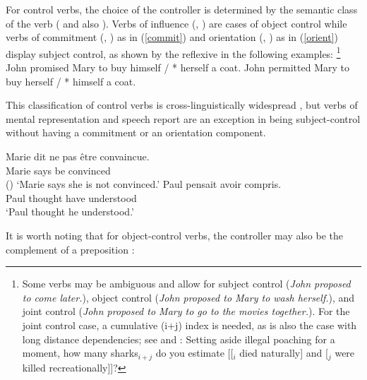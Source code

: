 For control verbs, the choice of the controller is determined by the semantic class of the verb
(\citealt[Chapter~3]{PollardandSag1994} and also \citealt{JackendoffandCulicover2003}).  Verbs of
influence (, ) are cases of object control while verbs of commitment
(, ) as in (\ref{commit}) and orientation (, ) as in
(\ref{orient}) display subject control, as shown by the reflexive in the following examples:%
\footnote{Some verbs may be ambiguous and allow for subject control (\emph{John proposed to come
    later.}), object control (\emph{John proposed to Mary to wash herself.}), and joint
  control (\emph{John proposed to Mary to go to the movies together.}). For the joint control case, a cumulative
  (i+j) index is needed, as is also the case with long distance dependencies; see
   and \crossrefchapterw[\pageref{ex:UDC:31}]{udc}:
\ea
Setting aside illegal poaching for a moment, how many sharks$_{i+j}$ do you estimate [[$_i$ died
naturally] and [$_j$ were killed recreationally]]?
\zlast
}
\eal
\ex\label{ex-John-promised-Mary-to-buy}
John promised Mary to buy himself / * herself a coat. \label{commit}
\ex\label{ex-John-permitted-Mary-to-buy} 
John permitted Mary to buy herself / * himself a coat.\label{orient}
\zl
 
  This classification of control verbs is cross-linguistically widespread \citep{VanValinandLapolla1997}, but  verbs of mental representation and speech report are an exception in being subject-control without having a commitment or an orientation component.


\begin{exe}
\ex \begin{xlist}
\ex 
\gll Marie dit {ne pas} \^etre convaincue.\\
     Marie says  be convinced \\\hfill()
\glt `Marie says she is not convinced.'	
\ex 
\gll Paul pensait  avoir compris. \\
     Paul thought have understood \\
\glt `Paul thought he understood.'
 \end{xlist}
\end{exe}

It is worth noting that for object-control verbs, the controller may also be the complement of a preposition \citep[]{PollardandSag1994}:

